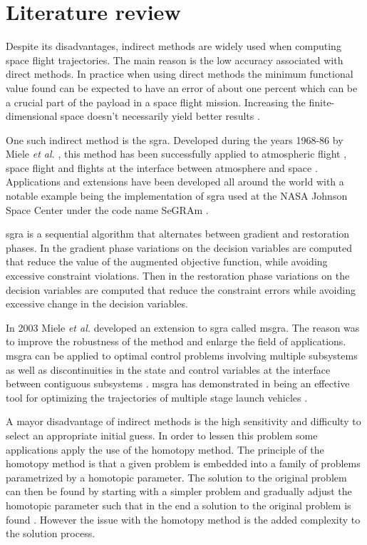 \section{Literature review}
Despite its disadvantages, indirect methods are widely used when computing space flight trajectories. The main reason is the low accuracy associated with direct methods. In practice when using direct methods the minimum functional value found can be expected to have an error of about one percent which can be a crucial part of the payload in a space flight mission. Increasing the finite-dimensional space doesn't necessarily yield better results \cite{von1992direct}.

One such indirect method is the \acrfull{sgra}. Developed during the years 1968-86 by Miele \emph{et al.} \cite{miele1970sequential}, this method has been successfully applied to atmospheric flight \cite{miele1986optimal}, space flight \cite{miele1999optimaltransfers, miele2001optimaltrajectories} and flights at the interface between atmosphere and space \cite{miele1998optimal, miele1993nominal, miele2000feasibility, miele2001assessment}. Applications and extensions have been developed all around the world with a notable example being the implementation of \acrshort{sgra} used at the NASA Johnson Space Center under the code name SeGRAm \cite{rishikof1992segram, miele2007optimal}.

\acrshort{sgra} is a sequential algorithm that alternates between gradient and restoration phases. In the gradient phase variations on the decision variables are computed that reduce the value of the augmented objective function, while avoiding excessive constraint violations. Then in the restoration phase variations on the decision variables are computed that reduce the constraint errors while avoiding excessive change in the decision variables.

In 2003 Miele \emph{et al.} developed an extension to \acrshort{sgra} called \acrfull{msgra}. The reason was to improve the robustness of the method and enlarge the field of applications. \acrshort{msgra} can be applied to optimal control problems involving multiple subsystems as well as discontinuities in the state and control variables at the interface between contiguous subsystems \cite{miele2003multiplep1}. \acrshort{msgra} has demonstrated in being an effective tool for optimizing the trajectories of multiple stage launch vehicles \cite{miele2003multiplep2}.

A mayor disadvantage of indirect methods is the high sensitivity and difficulty to select an appropriate initial guess. In order to lessen this problem some applications apply the use of the homotopy method. The principle of the homotopy method is that a given problem is embedded into a family of problems parametrized by a homotopic parameter. The solution to the original problem can then be found by starting with a simpler problem and gradually adjust the homotopic parameter such that in the end a solution to the original problem is found \cite{pan2016double}. However the issue with the homotopy method is the added complexity to the solution process.

